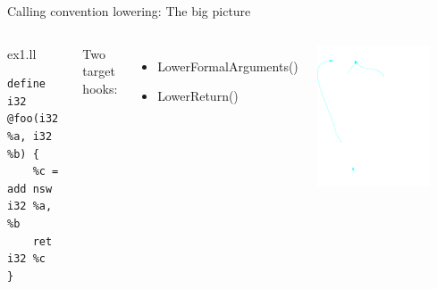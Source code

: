 \begin{frame}[fragile]{Calling convention lowering:
The big picture}

\begin{columns}[t]
    \begin{block}{ex1.ll}
    \begin{lstlisting}
define i32 @foo(i32 %a, i32 %b) {
    %c = add nsw i32 %a, %b
    ret i32 %c
}
    \end{lstlisting}
    \end{block}

    Two target hooks:
    \begin{itemize}
            \item LowerFormalArguments()
            \item LowerReturn()
    \end{itemize}
    \begin{block}{}
        \includegraphics[width = 0.8\textwidth]{examples/ex1-entry-selection-dag.png}
    \end{block}
\end{columns}    

\end{frame}

